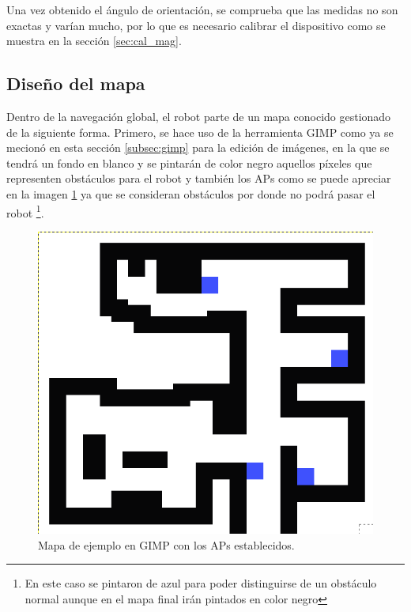 Una vez obtenido el ángulo de orientación, se comprueba que las medidas no son exactas y varían mucho, por lo que es necesario calibrar el dispositivo como se muestra en la sección \ref{sec:cal_mag}.



\subsection{Diseño del mapa}
\label{subsec:diseño_mapa}

Dentro de la navegación global, el robot parte de un mapa conocido gestionado de la siguiente forma. Primero, se hace uso de la herramienta GIMP como ya se mecionó en esta sección \ref{subsec:gimp} para la edición de imágenes, en la que se tendrá un fondo en blanco y se pintarán de color negro aquellos píxeles que representen obstáculos para el robot y también los APs como se puede apreciar en la imagen \ref{fig:mapa_apes} ya que se consideran obstáculos por donde no podrá pasar el robot \footnote{En este caso se pintaron de azul para poder distinguirse de un obstáculo normal aunque en el mapa final irán pintados en color negro}.

\begin{figure}[H]
  \centering
  \includegraphics[scale=0.3]{figs/mapa_apes} %
  \caption{ Mapa de ejemplo en GIMP con los APs establecidos.}
  \label{fig:mapa_apes}
\end{figure}

